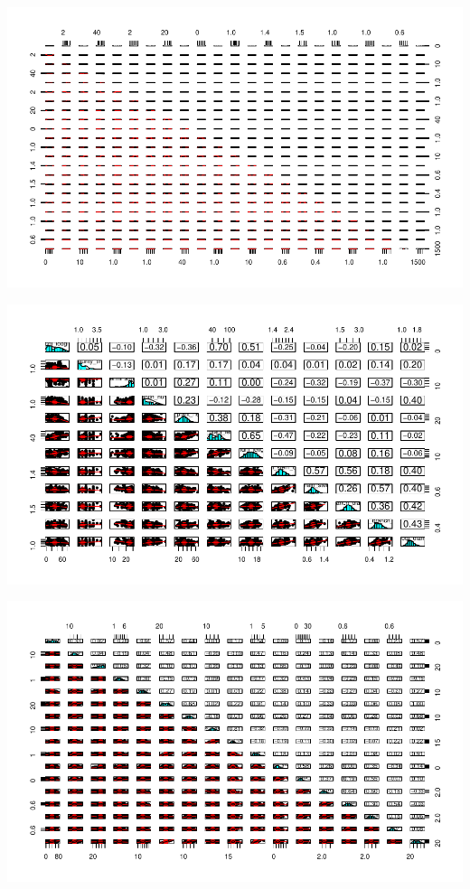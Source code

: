 \documentclass[11pt]{article}\usepackage[]{graphicx}\usepackage[]{color}
\makeatletter
\def\maxwidth{ %
  \ifdim\Gin@nat@width>\linewidth
    \linewidth
  \else
    \Gin@nat@width
  \fi
}
\newenvironment{knitrout}{}{} %
\makeatother
\begin{document}
\begin{knitrout}\footnotesize
{}\color{fgcolor}

{\centering \includegraphics[width=\maxwidth]{figure/bz-1} 

}




{\centering \includegraphics[width=\maxwidth]{figure/bz-2} 

}




{\centering \includegraphics[width=\maxwidth]{figure/bz-3} 

}
\end{knitrout}
\end{document}
